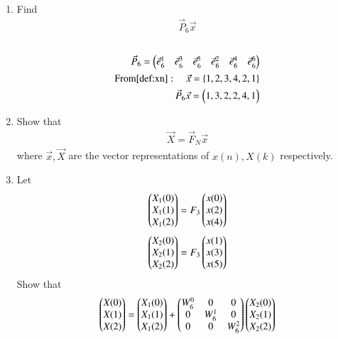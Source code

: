 \documentclass[journal,12pt,twocolumn]{IEEEtran}
\renewcommand\thesection{\arabic{section}}
\begin{document}
\begin{enumerate}[label=\arabic*.,ref=\thesection.\theenumi]
			\item Find 
			\begin{align}
				\vec{P}_6 \vec{x}
			\end{align}
			\solution\\
			\begin{align}
				\vec{P}_{6} = \begin{pmatrix}\vec{e}_6^{1} &\vec{e}_6^{3} &\vec{e}_6^{5} &\vec{e}_6^{2}
					&\vec{e}_6^{4} &\vec{e}_6^{6}\end{pmatrix}\\
				\text{From}\eqref{def:xn}: \quad \vec{x} = \left\{1,2,3,4,2,1\right\}\\
				\vec{P}_6 \vec{x} = \begin{pmatrix}1,3,2,2,4,1\end{pmatrix}
			\end{align}
			\item Show that 
			\begin{align}
				\vec{X} = \vec{F}_N \vec{x}
				\label{eq:dft-mat-def}
			\end{align}
			where $\vec{x}, \vec{X}$ are the vector representations of $x(n), X(k)$ respectively.
			\item 
			Let 
			\begin{equation}
				\begin{pmatrix}
					X_{1}(0) \\ 
					X_{1}(1) \\ 
					X_{1}(2) 
				\end{pmatrix}
				= F_{3}
				\begin{pmatrix}
					x(0) \\ 
					x(2) \\ 
					x(4) 
				\end{pmatrix}
			\end{equation}
			\begin{equation}
				\begin{pmatrix}
					X_{2}(0) \\ 
					X_{2}(1) \\ 
					X_{2}(2) 
				\end{pmatrix}
				= F_{3}
				\begin{pmatrix}
					x(1) \\ 
					x(3) \\ 
					x(5) 
				\end{pmatrix}
			\end{equation}
			Show that 
			\begin{equation}
				\begin{pmatrix}
					X(0) \\ 
					X(1) \\ 
					X(2)  
				\end{pmatrix}
				=
				\begin{pmatrix}
					X_{1}(0) \\ 
					X_{1}(1)\\ 
					X_{1}(2)
				\end{pmatrix}
				+
				\begin{pmatrix}
					W^{0}_{6} & 0 & 0\\
					0 & W^{1}_{6} & 0\\
					0 & 0 & W^{2}_{6}\\
				\end{pmatrix}
				\begin{pmatrix}
					X_{2}(0) \\ 
					X_{2}(1) \\ 
					X_{2}(2)
\end{pmatrix}
\end{equation}
\end{enumerate}
\end{document}
